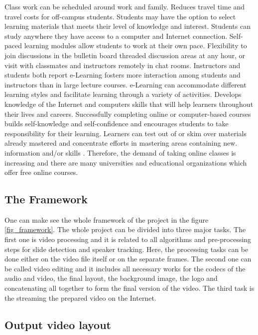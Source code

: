 \documentclass[[12pt,DIV14,BCOR12mm,a4paper,footexclude,headinclude,halfparskip-,twoside,openright,cleardoubleempty,idxtotoc,bibtotoc]{article}
\begin{document}
Class work can be scheduled around work and family.
Reduces travel time and travel costs for off-campus students.
Students may have the option to select learning materials that meets their level of knowledge and interest.
Students can study anywhere they have access to a computer and Internet connection.
Self-paced learning modules allow students to work at their own pace.
Flexibility to join discussions in the bulletin board threaded discussion areas at any hour, or visit with classmates and instructors remotely in chat rooms.
Instructors and students both report e-Learning fosters more interaction among students and instructors than in large lecture courses.
e-Learning can accommodate different learning styles and facilitate learning through a variety of activities. Develops knowledge of the Internet and computers skills that will help learners throughout their lives and careers.
Successfully completing online or computer-based courses builds self-knowledge and self-confidence and encourages students to take responsibility for their learning.
Learners can test out of or skim over materials already mastered and concentrate efforts in mastering areas containing new. information and/or skills \cite{onlinecourse}.
Therefore, the demand of taking online classes is increasing and there are many universities and educational organizations which offer free online courses. 



\subsection{The Framework }
One can make see the whole framework of the project in the figure \ref{fig_framework}. The whole project can be divided into three major tasks. The first one is video processing and it is related to all algorithms and pre-processing steps for slide detection and speaker tracking. Here, the processing tasks can be done either on the video file itself or on the separate frames. The second one can be called video editing and it includes all necessary works for the codecs of the audio and video, the final layout, the background image, the logo and concatenating all together to form the final version of the  video. The third task is the streaming the prepared video on the Internet.


\subsection{Output video layout}
\end{document}
